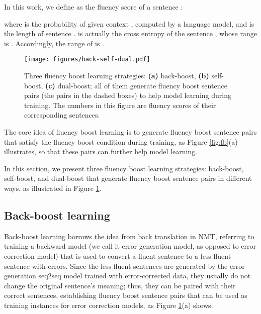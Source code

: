 \documentclass{article} \usepackage{MSRA_TR,times}
\begin{document}
In this work, we define  as the fluency score of a sentence :
\vspace{-0.05cm}




\noindent where  is the probability of  given context , computed by a language model, and  is the length of sentence .  is actually the cross entropy of the sentence , whose range is . Accordingly, the range of  is .

\begin{figure}[t]
\centering
\texttt{[image: figures/back-self-dual.pdf]}\vspace{-0.4cm}
\caption{Three fluency boost learning strategies: \textbf{(a)} back-boost, \textbf{(b)} self-boost, \textbf{(c)} dual-boost; all of them generate fluency boost sentence pairs (the pairs in the dashed boxes) to help model learning during training. The numbers in this figure are fluency scores of their corresponding sentences.}\label{fig:fbl}
\end{figure}

The core idea of fluency boost learning is to generate fluency boost sentence pairs that satisfy the fluency boost condition during training, as Figure \ref{fig:fb}(a) illustrates, so that these pairs can further help model learning.



In this section, we present three fluency boost learning strategies: back-boost, self-boost, and dual-boost that generate fluency boost sentence pairs in different ways, as illustrated in Figure \ref{fig:fbl}.

\subsection{Back-boost learning}\label{subsec:backboost}

Back-boost learning borrows the idea from back translation \citep{sennrich2016improving} in NMT, referring to training a backward model (we call it error generation model, as opposed to error correction model) that is used to convert a fluent sentence to a less fluent sentence with errors. Since the less fluent sentences are generated by the error generation seq2seq model trained with error-corrected data, they usually do not change the original sentence's meaning; thus, they can be paired with their correct sentences, establishing fluency boost sentence pairs that can be used as training instances for error correction models, as Figure \ref{fig:fbl}(a) shows.
\end{document}
